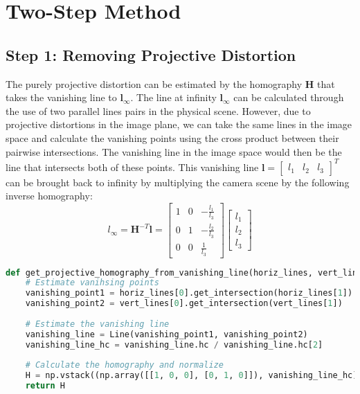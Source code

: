 \documentclass{article}
\begin{document}
\section{Two-Step Method} \label{sec:two-step-method}
\subsection{Step 1: Removing Projective Distortion}
The purely projective distortion can be estimated by the homography $\boldsymbol{H}$ that takes the vanishing line to $\boldsymbol{l_\infty}$. The line at infinity $\boldsymbol{l_\infty}$ can be calculated through the use of two parallel lines pairs in the physical scene. However, due to projective distortions in the image plane, we can take the same lines in the image space and calculate the vanishing points using the cross product between their pairwise intersections. The vanishing line in the image space would then be the line that intersects both of these points. This vanishing line $\boldsymbol{l} = \begin{bmatrix}
    l_1 & l_2 & l_3
\end{bmatrix} ^T$ can be brought back to infinity by multiplying the camera scene by the following inverse homography:
\[l_\infty = \boldsymbol{H}^{-T} \boldsymbol{l} = \begin{bmatrix}
    1 & 0 & -\frac{l_1}{l_3} \\ 
    0 & 1 & -\frac{l_2}{l_3} \\
    0 & 0 & \frac{1}{l_3}
\end{bmatrix} \begin{bmatrix}
    l_1 \\ l_2 \\ l_3
\end{bmatrix}\]

\begin{lstlisting}[language=Python]
def get_projective_homography_from_vanishing_line(horiz_lines, vert_lines):
    # Estimate vanihsing points
    vanishing_point1 = horiz_lines[0].get_intersection(horiz_lines[1])
    vanishing_point2 = vert_lines[0].get_intersection(vert_lines[1])
    
    # Estimate the vanishing line
    vanishing_line = Line(vanishing_point1, vanishing_point2)
    vanishing_line_hc = vanishing_line.hc / vanishing_line.hc[2]
    
    # Calculate the homography and normalize
    H = np.vstack((np.array([[1, 0, 0], [0, 1, 0]]), vanishing_line_hc))
    return H
\end{lstlisting}
\end{document}
